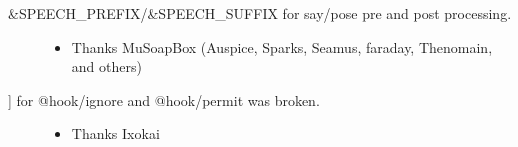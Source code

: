 \documentclass[letterpaper,10pt,english]{sphinxmanual}
\begin{document}
\begin{description}
\begin{itemize}
\end{itemize}

\item[{\&SPEECH\_PREFIX/\&SPEECH\_SUFFIX for say/pose pre and post processing.}] \leavevmode\begin{itemize}
\item {} 
\sphinxAtStartPar
Thanks MuSoapBox (Auspice, Sparks, Seamus, faraday, Thenomain, and others)

\end{itemize}

\item[{{]} for @hook/ignore and @hook/permit was broken.}] \leavevmode\begin{itemize}
\item {} 
\sphinxAtStartPar
Thanks Ixokai

\end{itemize}

\end{description}
\end{document}
